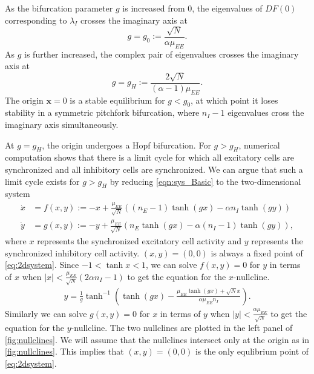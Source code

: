 \documentclass[11pt,reqno]{amsart}
\newcommand{\xvec}{\mathbf{x}}
\begin{document}
As the bifurcation parameter $g$ is increased from 0, the eigenvalues of $DF(0)$ corresponding to $\lambda_I$ crosses the imaginary axis at
\begin{equation}\label{eq:pitchlocation}
    g = g_0 := \frac{\sqrt{N}}{\alpha \mu_{EE}}.
\end{equation}
As $g$ is further increased, the complex pair of eigenvalues crosses the imaginary axis at 
\begin{equation}\label{eq:0hopflocation}
    g= g_H := \frac{ 2\sqrt{N} }{ (\alpha-1)\mu_{EE} }.
\end{equation}
The origin $\xvec = 0$ is a stable equilibrium for $g < g_0$, at which point it loses stability in a symmetric pitchfork bifurcation, where $n_I -1$ eigenvalues cross the imaginary axis simultaneously. 

At $g = g_H$, the origin undergoes a Hopf bifurcation. For $g > g_H$, numerical computation shows that there is a limit cycle for which all excitatory cells are synchronized and all inhibitory cells are synchronized. We can argue that such a limit cycle exists for $g > g_H$ by reducing \cref{eqn:sys_Basic} to the two-dimensional system
\begin{equation}\label{eq:2dsystem}
\begin{aligned}
\dot{x} &= f(x, y) := -x + \frac{\mu_{EE}}{\sqrt{N}}\left((n_E - 1) \tanh(g x) - \alpha n_I \tanh(g y) \right) \\
\dot{y} &= g(x, y) := -y + \frac{\mu_{EE}}{\sqrt{N}}\left( n_E \tanh(g x) - \alpha (n_I - 1) \tanh(g y) \right), 
\end{aligned}
\end{equation}
where $x$ represents the synchronized excitatory cell activity and $y$ represents the synchronized inhibitory cell activity. $(x, y) = (0, 0)$ is always a fixed point of \cref{eq:2dsystem}. Since $-1 < \tanh x < 1$, we can solve $f(x, y) = 0$ for $y$ in terms of $x$ when $|x| < \frac{\mu_{EE}}{\sqrt{N}}( 2 \alpha n_I - 1)$ to get the equation for the $x$-nullcline.
\begin{align*}
y = \frac{1}{g} \tanh ^{-1} \left( \tanh (g x) - \frac{ \mu_{EE} \tanh (g x) + \sqrt{N} x}{\alpha \mu_{EE} n_I} \right).
\end{align*}
Similarly we can solve $g(x, y) = 0$ for $x$ in terms of $y$ when $|y| < \frac{\alpha \mu_{EE}}{\sqrt{N}}$ to get the equation for the $y$-nullcline. The two nullclines are plotted in the left panel of \cref{fig:nullclines}. We will assume that the nullclines intersect only at the origin as in \cref{fig:nullclines}. This implies that $(x,y) = (0,0)$ is the only equlibrium point of \cref{eq:2dsystem}. 
\end{document}
